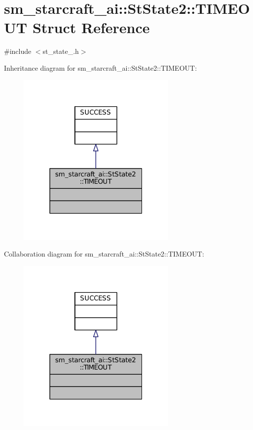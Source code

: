 \hypertarget{structsm__starcraft__ai_1_1StState2_1_1TIMEOUT}{}\section{sm\+\_\+starcraft\+\_\+ai\+:\+:St\+State2\+:\+:T\+I\+M\+E\+O\+UT Struct Reference}
\label{structsm__starcraft__ai_1_1StState2_1_1TIMEOUT}


{\ttfamily \#include $<$st\+\_\+state\+\_.\+h$>$}



Inheritance diagram for sm\+\_\+starcraft\+\_\+ai\+:\+:St\+State2\+:\+:T\+I\+M\+E\+O\+UT\+:
\nopagebreak
\begin{figure}[H]
\begin{center}
\leavevmode
\includegraphics[width=220pt]{structsm__starcraft__ai_1_1StState2_1_1TIMEOUT__inherit__graph}
\end{center}
\end{figure}


Collaboration diagram for sm\+\_\+starcraft\+\_\+ai\+:\+:St\+State2\+:\+:T\+I\+M\+E\+O\+UT\+:
\nopagebreak
\begin{figure}[H]
\begin{center}
\leavevmode
\includegraphics[width=220pt]{structsm__starcraft__ai_1_1StState2_1_1TIMEOUT__coll__graph}
\end{center}
\end{figure}


